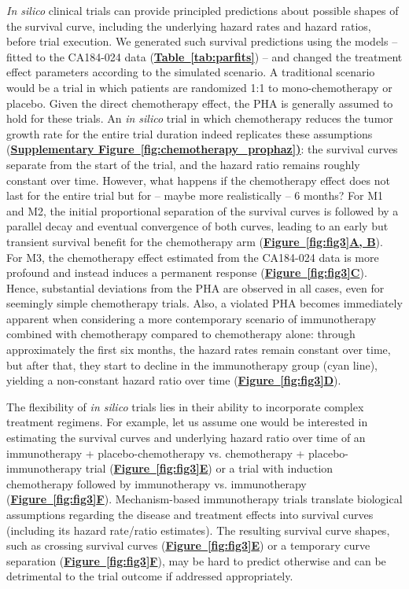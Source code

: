 \documentclass[a4paper,10pt]{article}
\newcommand{\myref}[2]{\hyperref[#1]{\bfseries Figure~\ref*{#1}#2}}
\newcommand{\mytab}[1]{\hyperref[#1]{\bfseries Table~\ref*{#1}}}
\newcommand{\mysupp}[2]{\hyperref[#1]{\bfseries Supplementary Figure~\ref*{#1}#2}}
\newcommand{\newbit}{\color{red!70!black}}
\begin{document}
\emph{In silico} clinical trials can provide principled predictions about possible
shapes of the survival curve, including the underlying hazard rates and hazard ratios, before
trial execution. 
{\newbit {}
We generated such survival predictions using the models -- fitted 
to the CA184-024 data (\mytab{tab:parfits}) -- 
and changed the treatment effect parameters according to the simulated scenario.
}
A traditional scenario would be a trial in which
patients are randomized 1:1 to mono-chemotherapy or placebo. Given the direct
chemotherapy effect, the PHA is generally assumed to hold for these trials. An
\emph{in silico} trial in which chemotherapy reduces the tumor growth rate 
for the entire trial duration indeed replicates these assumptions
(\mysupp{fig:chemotherapy_prophaz}): the survival curves separate from the start of the
trial, and the hazard ratio remains roughly constant over time. However, what happens if the
chemotherapy effect does not last for the entire trial but for -- maybe more
realistically -- 6 months? For M1 and M2, the initial proportional separation of the survival
curves is followed by a parallel decay and eventual convergence of both curves, leading to an
early but transient survival benefit for the chemotherapy arm (\myref{fig:fig3}{A, B}). 
For M3, the chemotherapy effect estimated from the CA184-024 data is more profound
and instead induces a permanent response (\myref{fig:fig3}{C}).
Hence, substantial deviations from the PHA are observed in all cases, even for seemingly
simple chemotherapy trials.  
Also, a violated PHA becomes immediately apparent when considering a more contemporary
scenario of immunotherapy combined with chemotherapy
compared to chemotherapy alone: through approximately the first
six months, the hazard rates remain constant over time, but after that, they
start to decline in the immunotherapy group (cyan line), yielding a non-constant
hazard ratio over time (\myref{fig:fig3}{D}).

The flexibility of \emph{in silico} trials lies in their ability to incorporate
complex treatment regimens. For example, let us assume one would be interested
in estimating the survival curves and underlying hazard ratio over time of 
an immunotherapy + placebo-chemotherapy vs. chemotherapy + placebo-immunotherapy
trial (\myref{fig:fig3}{E}) or a trial with induction chemotherapy followed by immunotherapy vs.
immunotherapy (\myref{fig:fig3}{F}). Mechanism-based immunotherapy trials 
translate biological assumptions regarding the disease and treatment
effects into survival curves (including its hazard rate/ratio estimates).
The resulting survival curve shapes, such as crossing survival curves (\myref{fig:fig3}{E}) or a
temporary curve separation (\myref{fig:fig3}{F}), may be hard to predict otherwise and
can be detrimental to the trial outcome if addressed appropriately. 
\end{document}
